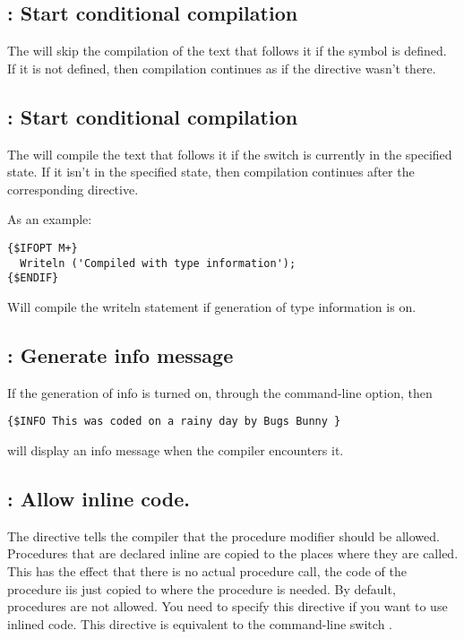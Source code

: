 \documentclass{report}
\begin{document}
\subsection{ : Start conditional compilation}

The  will skip the compilation of the text that
follows it if the symbol  is defined. If it is not defined, then
compilation continues as if the directive wasn't there.

\subsection{ : Start conditional compilation}

The  will compile the text that follows it if the
switch  is currently in the specified state.
If it isn't in the specified state, then compilation continues after the
corresponding  directive.

As an example:
\begin{verbatim}
{$IFOPT M+}
  Writeln ('Compiled with type information');
{$ENDIF}
\end{verbatim}
Will compile the writeln statement if generation of type information is on.

\subsection{ : Generate info message}

If the generation of info is turned on, through the  command-line
option, then
\begin{verbatim}
{$INFO This was coded on a rainy day by Bugs Bunny }
\end{verbatim}
will display an info message when the compiler encounters it.

\subsection{ : Allow inline code.} 
The  directive tells the compiler that the 
procedure modifier should be allowed. Procedures that are declared inline
are copied to the places where they are called. This has the effect that
there is no actual procedure call, the code of the procedure iis just copied
to where the procedure is needed. By default,  procedures are
not allowed. You need to specify this directive if you want to use inlined
code. This directive is equivalent to the command-line switch .
\end{document}

